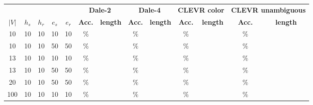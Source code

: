 \begin{table}[h]
    \centering
    \begin{tabular}{ccccc|cc|cc|cc|cc}
        \toprule
              &         &         &         &         & \multicolumn{2}{c}{\textbf{Dale-2}} & \multicolumn{2}{c}{\textbf{Dale-4}} & \multicolumn{2}{c}{\textbf{CLEVR color}} & \multicolumn{2}{c}{\textbf{CLEVR unambiguous}}                                                                     \\\cmidrule(lr){6-7}\cmidrule(lr){8-9}\cmidrule(lr){10-11}\cmidrule(lr){12-13}
        $|V|$ & $h_{s}$ & $h_{r}$ & $e_{s}$ & $e_{r}$ & \textbf{Acc.}                       & \textbf{length}                     & \textbf{Acc.}                            & \textbf{length}                                & \textbf{Acc.} & \textbf{length} & \textbf{Acc.} & \textbf{length} \\\midrule
        {10}  & {10}    & {10}    & {10}    & {10}    & {\%}                                & {}                                  & {\%}                                     & {}                                             & {\%}          & {}              & {\%}          & {}              \\
        {10}  & {10}    & {10}    & {50}    & {50}    & {\%}                                & {}                                  & {\%}                                     & {}                                             & {\%}          & {}              & {\%}          & {}              \\
        {13}  & {10}    & {10}    & {10}    & {10}    & {\%}                                & {}                                  & {\%}                                     & {}                                             & {\%}          & {}              & {\%}          & {}              \\
        {13}  & {10}    & {10}    & {50}    & {50}    & {\%}                                & {}                                  & {\%}                                     & {}                                             & {\%}          & {}              & {\%}          & {}              \\
        {20}  & {10}    & {10}    & {50}    & {50}    & {\%}                                & {}                                  & {\%}                                     & {}                                             & {\%}          & {}              & {\%}          & {}              \\
        {100} & {10}    & {10}    & {10}    & {10}    & {\%}                                & {}                                  & {\%}                                     & {}                                             & {\%}          & {}              & {\%}          & {}              \\

\end{tabular}
\end{table}
